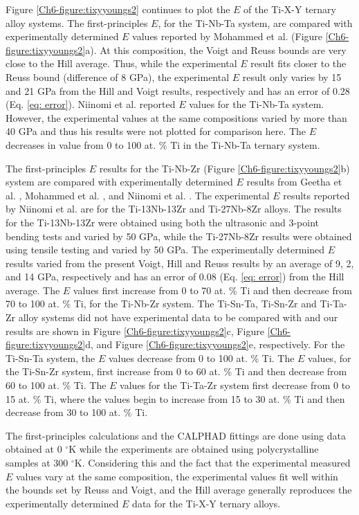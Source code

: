 Figure \ref{Ch6-figure:tixyyoungs2} continues to plot the $E$ of the Ti-X-Y ternary alloy systems. The first-principles $E$, for the Ti-Nb-Ta system, are compared with experimentally determined $E$ values reported by Mohammed et al. \cite{Mohammed2014} (Figure \ref{Ch6-figure:tixyyoungs2}a). At this composition, the Voigt and Reuss bounds are very close to the Hill average. Thus, while the experimental $E$ result fits closer to the Reuss bound (difference of 8 GPa), the experimental $E$ result only varies by 15 and 21 GPa from the Hill and Voigt results, respectively and has an error of 0.28 (Eq. \ref{eq: error}). Niinomi et al. \cite{Niinomi2012} reported $E$ values for the Ti-Nb-Ta system. However, the experimental values at the same compositions varied by more than 40 GPa and thus his results were not plotted for comparison here. The $E$ decreases in value from 0 to 100 at. \% Ti in the Ti-Nb-Ta ternary system. 

The first-principles $E$ results for the Ti-Nb-Zr (Figure \ref{Ch6-figure:tixyyoungs2}b) system are compared with experimentally determined $E$ results from Geetha et al. \cite{Geetha2009},  Mohammed et al. \cite{Mohammed2014}, and Niinomi et al. \cite{Niinomi2012}. The experimental $E$ results reported by Niinomi et al. \cite{Niinomi2012} are for the Ti-13Nb-13Zr and Ti-27Nb-8Zr alloys. The results for the Ti-13Nb-13Zr were obtained using both the ultrasonic and 3-point bending tests and varied by 50 GPa, while the Ti-27Nb-8Zr results were obtained using tensile testing and varied by 50 GPa. The experimentally determined $E$ results varied from the present Voigt, Hill and Reuss results by an average of 9, 2, and 14 GPa, respectively and has an error of 0.08 (Eq. \ref{eq: error}) from the Hill average. The $E$ values first increase from 0 to 70 at. \% Ti and then decrease from 70 to 100 at. \% Ti, for the Ti-Nb-Zr system. The Ti-Sn-Ta, Ti-Sn-Zr and Ti-Ta-Zr alloy systems did not have experimental data to be compared with and our results are shown in Figure \ref{Ch6-figure:tixyyoungs2}c, Figure \ref{Ch6-figure:tixyyoungs2}d, and Figure \ref{Ch6-figure:tixyyoungs2}e, respectively. For the Ti-Sn-Ta system, the $E$ values decrease from 0 to 100 at. \% Ti. The $E$ values, for the Ti-Sn-Zr system, first increase from 0 to 60 at. \% Ti and then decrease from 60 to 100 at. \% Ti. The $E$ values for the Ti-Ta-Zr system first decrease from 0 to 15 at. \% Ti, where the values begin to increase from 15 to 30 at. \% Ti and then decrease from 30 to 100 at. \% Ti. 

The first-principles calculations and the CALPHAD fittings are done using data obtained at 0 $^\circ$K while the experiments are obtained using polycrystalline samples at 300 $^\circ$K. Considering this and the fact that the experimental measured $E$ values vary at the same composition, the experimental values fit well within the bounds set by Reuss and Voigt, and the Hill average generally reproduces the experimentally determined $E$ data for the Ti-X-Y ternary alloys. 

